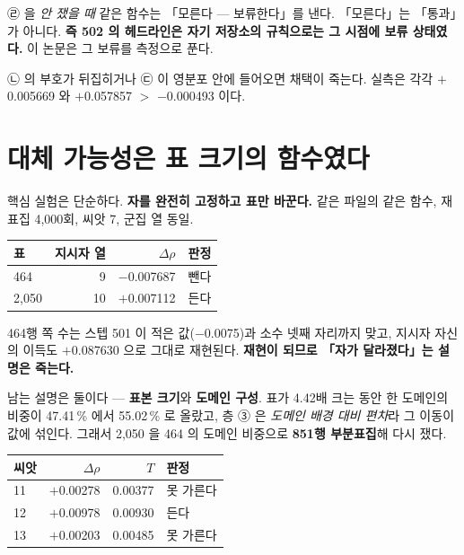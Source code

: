 \documentclass[10pt]{article}
\begin{document}
$\text{㉣}$ 을 \emph{안 쟀을 때} 같은 함수는 「모른다 --- 보류한다」를 낸다. 「모른다」는
「통과」가 아니다. \textbf{즉 502 의 헤드라인은 자기 저장소의 규칙으로는 그 시점에 보류
상태였다.} 이 논문은 그 보류를 측정으로 푼다.

{$\text{㉡}$ 의 부호가 뒤집히거나 $\text{㉢}$ 이 영분포 안에 들어오면 채택이 죽는다.
실측은 각각 $+$0.005669 와 $+$0.057857 $>$ $-$0.000493 이다.}

\section{대체 가능성은 표 크기의 함수였다}

핵심 실험은 단순하다. \textbf{자를 완전히 고정하고 표만 바꾼다.} 같은 파일의 같은
함수, 재표집 4{,}000회, 씨앗 7, 군집 열 동일.

\begin{center}\small
\begin{tabular}{lrrl}
\hline
표 & 지시자 열 & $\Delta\rho$ & 판정 \\
\hline
464 & 9 & $-$0.007687 & 뺀다 \\
2{,}050 & 10 & $+$0.007112 & 든다 \\
\hline
\end{tabular}
\end{center}

464행 쪽 수는 스텝 501 이 적은 값($-$0.0075)과 소수 넷째 자리까지 맞고, 지시자 자신의
이득도 $+$0.087630 으로 그대로 재현된다. \textbf{재현이 되므로 「자가 달라졌다」는 설명은
죽는다.}

남는 설명은 둘이다 --- \textbf{표본 크기}와 \textbf{도메인 구성}. 표가 4.42배 크는 동안 한
도메인의 비중이 47.41\,\% 에서 55.02\,\% 로 올랐고, 층 ③ 은 \emph{도메인 배경 대비 편차}라
그 이동이 값에 섞인다. 그래서 2{,}050 을 464 의 도메인 비중으로 \textbf{851행 부분표집}해
다시 쟀다.

\begin{center}\small
\begin{tabular}{lrrl}
\hline
씨앗 & $\Delta\rho$ & $T$ & 판정 \\
\hline
11 & $+$0.00278 & 0.00377 & 못 가른다 \\
12 & $+$0.00978 & 0.00930 & 든다 \\
13 & $+$0.00203 & 0.00485 & 못 가른다 \\
\hline
\end{tabular}
\end{center}
\end{document}
